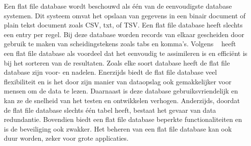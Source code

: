 Een flat file database wordt beschouwd als één van de eenvoudigste database systemen. Dit systeem omvat het opslaan van gegevens in een binair document of plain tekst document zoals CSV, txt, of TSV. Een flat file database heeft slechts een entry per regel. Bij deze database worden records van elkaar gescheiden door gebruik te maken van scheidingstekens zoals tabs en komma's. Volgens ~\textcite{geeksforgeeks2024} heeft een flat file database als voordeel dat het eenvoudig te assimileren is en efficiënt is bij het sorteren van de resultaten. Zoals elke soort database heeft de flat file database zijn voor- en nadelen. Enerzijds biedt de flat file database veel flexibiliteit en is het door zijn manier van dataopslag ook gemakkelijker voor mensen om de data te lezen. Daarnaast is deze database gebruiksvriendelijk en kan ze de snelheid van het testen en ontwikkelen verhogen. Anderzijds, doordat de flat file database slechts één tabel heeft, bestaat het gevaar van data redundantie. Bovendien biedt een flat file database beperkte functionaliteiten en is de beveiliging ook zwakker. Het beheren van een flat file database kan ook duur worden, zeker voor grote applicaties.

\section{}%
\label{sec:relationele-databases}

